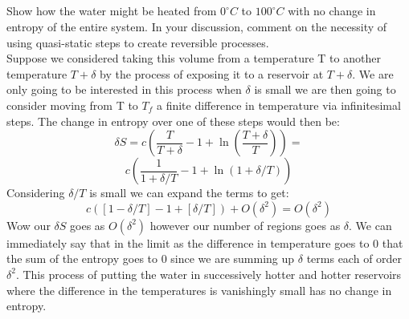 \documentclass[10pt,a4paper]{article}
\begin{document}
\subsection{}
Show how the water might be heated from $0^\circ C$ to $100^\circ C$ with no change in entropy of the entire system. In your discussion, comment on the necessity of using quasi-static steps to create reversible processes.\\
Suppose we considered taking this volume from a temperature T to another temperature $T+\delta$ by the process of exposing it to a reservoir at $T+\delta$.  We are only going to be interested in this process when $\delta$ is small we are then going to consider moving from T to $T_f$ a finite difference in temperature via infinitesimal steps.  The change in entropy over one of these steps would then be:
$$\delta S=c(\frac{T}{T+\delta}-1+\ln(\frac{T+\delta}{T}))=$$
$$c(\frac{1}{1+\delta/T}-1+\ln(1+\delta/T))$$
Considering $\delta /T$ is small we can expand the terms to get:
$$c([1-\delta/T]-1+[\delta/T])+O(\delta^2)=O(\delta^2)$$
Wow our $\delta S$ goes as $O(\delta^2)$ however our number of regions goes as $\delta$.  We can immediately say that in the limit as the difference in temperature goes to 0 that the sum of the entropy goes to 0 since we are summing up $\delta$ terms each of order $\delta^2$.  This process of putting the water in successively hotter and hotter reservoirs where the difference in the temperatures is vanishingly small has no change in entropy.
\end{document}
